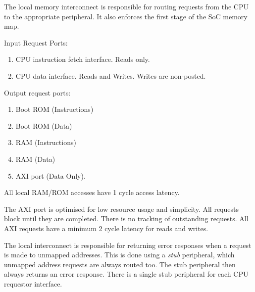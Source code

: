 
The local memory interconnect is responsible for routing requests from the
CPU to the appropriate peripheral.
It also enforces the first stage of the SoC memory map.

\noindent Input Request Ports:
\begin{enumerate}

\item CPU instruction fetch interface. Reads only.

\item CPU data interface. Reads and Writes. Writes are non-posted.

\end{enumerate}


\noindent Output request ports:
\begin{enumerate}

\item Boot ROM (Instructions)

\item Boot ROM (Data)

\item RAM (Instructions)

\item RAM (Data)

\item AXI port (Data Only).

\end{enumerate}

All local RAM/ROM accesses have 1 cycle access latency.

The AXI port is optimised for low resource usage and simplicity.
All requests block until they are completed. There is no
tracking of outstanding requests.
All AXI requests have a minimum 2 cycle latency for reads and writes.

The local interconnect is responsible for returning error responses
when a request is made to unmapped addresses.
This is done using a {\em stub} peripheral, which unmapped address
requests are always routed too.
The stub peripheral then always returns an error response.
There is a single stub peripheral for each CPU requestor interface.

